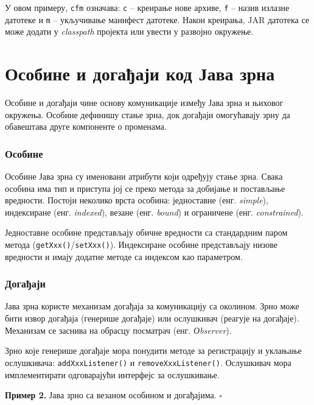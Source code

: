 У овом примеру, \texttt{cfm} означава: \texttt{c} – креирање нове архиве, \texttt{f} – назив излазне датотеке и \texttt{m} – укључивање манифест датотеке. Након креирања, JAR датотека се може додати у \textit{classpath} пројекта или увести у развојно окружење.


\section{Особине и догађаји код Јава зрна}

Особине и догађаји чине основу комуникације између Јава зрна и њиховог окружења. Особине дефинишу стање зрна, док догађаји омогућавају зрну да обавештава друге компоненте о променама.


\subsubsection{Особине}

Особине Јава зрна су именовани атрибути који одређују стање зрна. Свака особина има тип и приступа јој се преко метода за добијање и постављање вредности. Постоји неколико врста особина: једноставне (енг. \textit{simple}), индексиране (енг. \textit{indexed}), везане (енг. \textit{bound}) и ограничене (енг. \textit{constrained}).

Једноставне особине представљају обичне вредности са стандардним паром метода (\texttt{getXxx()}/\texttt{setXxx()}). Индексиране особине представљају низове вредности и имају додатне методе са индексом као параметром.


\subsubsection{Догађаји}

Јава зрна користе механизам догађаја за комуникацију са околином. Зрно може бити извор догађаја (генерише догађаје) или ослушкивач (реагује на догађаје). Механизам се заснива на обрасцу посматрач (енг. \textit{О}\textit{bserver}).

Зрно које генерише догађаје мора понудити методе за регистрацију и уклањање ослушкивача: \texttt{addXxxListener()} и \texttt{removeXxxListener()}. Ослушкивач мора имплементирати одговарајући интерфејс за ослушкивање.


\bigskip

\noindent \textbf{Пример 2.} Јава зрно са везаном особином и догађајима. $\square$

\medskip

